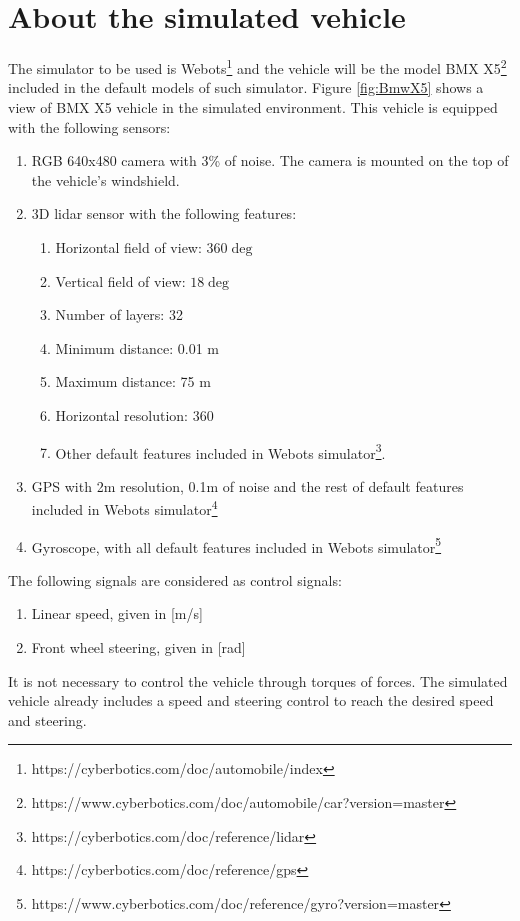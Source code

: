\documentclass[letterpaper,12pt]{article}
\begin{document}
\section{About the simulated vehicle}
The simulator to be used is Webots\footnote{https://cyberbotics.com/doc/automobile/index} and the vehicle will be the model BMX X5\footnote{https://www.cyberbotics.com/doc/automobile/car?version=master} included in the default models of such simulator. Figure \ref{fig:BmwX5} shows a view of BMX X5 vehicle in the simulated environment. This vehicle is equipped with the following sensors:
\begin{enumerate}
\item RGB 640x480 camera with 3\% of noise. The camera is mounted on the top of the vehicle's windshield. 
\item 3D lidar sensor with the following features:
  \begin{enumerate}
  \item Horizontal field of view:  $360\deg$
  \item Vertical field of view: $18\deg$
  \item Number of layers: 32
  \item Minimum distance: 0.01 m
  \item Maximum distance: 75 m
  \item Horizontal resolution: 360
  \item Other default features included in Webots simulator\footnote{https://cyberbotics.com/doc/reference/lidar}.
  \end{enumerate}
\item GPS with 2m resolution, 0.1m of noise and the rest of default features included in Webots simulator\footnote{https://cyberbotics.com/doc/reference/gps}
\item Gyroscope, with all default features included in Webots simulator\footnote{https://www.cyberbotics.com/doc/reference/gyro?version=master}
\end{enumerate}

The following signals are considered as control signals:
\begin{enumerate}
\item Linear speed, given in [m/s]
\item Front wheel steering, given in [rad]
\end{enumerate}
It is not necessary to control the vehicle through torques of forces. The simulated vehicle already includes a speed and steering control to reach the desired speed and steering.
\end{document}
